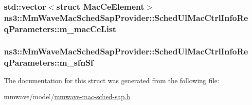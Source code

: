\subsubsection[{\texorpdfstring{m\+\_\+mac\+Ce\+List}{m_macCeList}}]{\setlength{\rightskip}{0pt plus 5cm}std\+::vector$<$struct {\bf Mac\+Ce\+Element}$>$ ns3\+::\+Mm\+Wave\+Mac\+Sched\+Sap\+Provider\+::\+Sched\+Ul\+Mac\+Ctrl\+Info\+Req\+Parameters\+::m\+\_\+mac\+Ce\+List}\hypertarget{structns3_1_1MmWaveMacSchedSapProvider_1_1SchedUlMacCtrlInfoReqParameters_a75963eebf090412b5948a4c71d618f70}{}\label{structns3_1_1MmWaveMacSchedSapProvider_1_1SchedUlMacCtrlInfoReqParameters_a75963eebf090412b5948a4c71d618f70}
\subsubsection[{\texorpdfstring{m\+\_\+sfn\+Sf}{m_sfnSf}}]{ ns3\+::\+Mm\+Wave\+Mac\+Sched\+Sap\+Provider\+::\+Sched\+Ul\+Mac\+Ctrl\+Info\+Req\+Parameters\+::m\+\_\+sfn\+Sf}\hypertarget{structns3_1_1MmWaveMacSchedSapProvider_1_1SchedUlMacCtrlInfoReqParameters_aebf3380508f5e62060f8aeffe4008b64}{}\label{structns3_1_1MmWaveMacSchedSapProvider_1_1SchedUlMacCtrlInfoReqParameters_aebf3380508f5e62060f8aeffe4008b64}


The documentation for this struct was generated from the following file\+:\begin{DoxyCompactItemize}
\item 
mmwave/model/\hyperlink{mmwave-mac-sched-sap_8h}{mmwave-\/mac-\/sched-\/sap.\+h}\end{DoxyCompactItemize}
